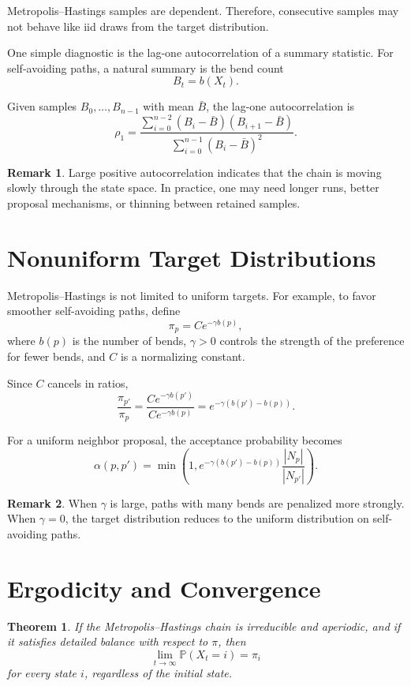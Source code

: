 \documentclass[12pt,oneside]{book}
\numberwithin{equation}{section}
\theoremstyle{definition}
\newtheorem{remark}{Remark}[section]
\theoremstyle{plain}
\newtheorem{theorem}{Theorem}[section]
\theoremstyle{remark}
\newcommand{\Prob}{\mathbb{P}}
\begin{document}
Metropolis--Hastings samples are dependent. Therefore, consecutive samples may not behave like iid draws from the target distribution.

One simple diagnostic is the lag-one autocorrelation of a summary statistic. For self-avoiding paths, a natural summary is the bend count
\[
B_t=b(X_t).
\]

Given samples $B_0,\ldots,B_{n-1}$ with mean $\bar{B}$, the lag-one autocorrelation is
\[
\rho_1
=
\frac{
\sum_{i=0}^{n-2}(B_i-\bar{B})(B_{i+1}-\bar{B})
}{
\sum_{i=0}^{n-1}(B_i-\bar{B})^2
}.
\]

\begin{remark}
Large positive autocorrelation indicates that the chain is moving slowly through the state space. In practice, one may need longer runs, better proposal mechanisms, or thinning between retained samples.
\end{remark}

\section{Nonuniform Target Distributions}

Metropolis--Hastings is not limited to uniform targets. For example, to favor smoother self-avoiding paths, define
\[
\pi_p = C e^{-\gamma b(p)},
\]
where $b(p)$ is the number of bends, $\gamma>0$ controls the strength of the preference for fewer bends, and $C$ is a normalizing constant.

Since $C$ cancels in ratios,
\[
\frac{\pi_{p'}}{\pi_p}
=
\frac{C e^{-\gamma b(p')}}{C e^{-\gamma b(p)}}
=
e^{-\gamma(b(p')-b(p))}.
\]

For a uniform neighbor proposal, the acceptance probability becomes
\[
\alpha(p,p')
=
\min\left(
1,
e^{-\gamma(b(p')-b(p))}
\frac{|N_p|}{|N_{p'}|}
\right).
\]

\begin{remark}
When $\gamma$ is large, paths with many bends are penalized more strongly. When $\gamma=0$, the target distribution reduces to the uniform distribution on self-avoiding paths.
\end{remark}

\section{Ergodicity and Convergence}

\begin{theorem}
If the Metropolis--Hastings chain is irreducible and aperiodic, and if it satisfies detailed balance with respect to $\pi$, then
\[
\lim_{t\to\infty}\Prob(X_t=i)=\pi_i
\]
for every state $i$, regardless of the initial state.
\end{theorem}
\end{document}
